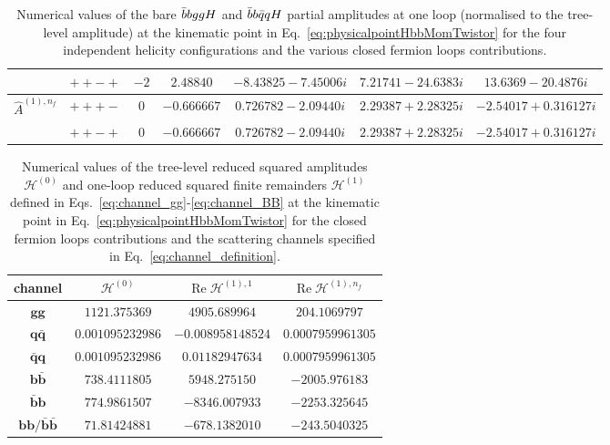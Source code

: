 \documentclass[main.tex]{subfiles}
\begin{document}
\begin{table}[t!]
\begin{tabularx}{1.0\textwidth}{|C{0.7}|C{0.8}|C{0.5}|C{1.2}|C{1.2}|C{1.3}|C{1.3}|}
                 & $++-+$ & $ -2 $ & $ 2.48840$ & $ -8.43825 - 7.45006 i$ & $ 7.21741 - 24.6383 i$ & $ 13.6369 - 20.4876 i $ \\
\hline
$\hat A^{(1),n_f}$ & $+++-$ & $ 0$ & $ -0.666667$ & $ 0.726782 - 2.09440 i$ & $ 2.29387 + 2.28325 i$ & $ -2.54017 + 0.316127 i $ \\
                   & $++-+$ & $ 0$ & $ -0.666667$ & $ 0.726782 - 2.09440 i$ & $ 2.29387 + 2.28325 i$ & $ -2.54017 + 0.316127 i $ \\
\hline
\end{tabularx}
\caption{\label{tab:benchmarkbare1L} Numerical values of the bare $\bar{b}bggH$ and $\bar{b}b\bar{q}qH$ partial amplitudes at one loop (normalised to the tree-level amplitude) at the kinematic point in 
Eq.~\ref{eq:physicalpointHbbMomTwistor} for the four independent helicity configurations and the various closed fermion loops contributions. }
\end{table}

\begin{table}[t!]
\centering
\begin{tabularx}{0.85\textwidth}{|C{0.7}|C{1.1}|C{1.1}|C{1.1}|}
\hline
channel & $\mathcal{H}^{(0)}$ & $\mathrm{Re}\;\mathcal{H}^{(1),1}$ & $\mathrm{Re}\;\mathcal{H}^{(1),n_f}$  \\
\hline
$\mathbf{gg}$       & $ 1121.375369 $    & $ 4905.689964$ & $ 204.1069797 $ \\
$\mathbf{q\bar{q}}$ & $ 0.001095232986 $ & $ -0.008958148524$ & $ 0.0007959961305 $ \\
$\mathbf{\bar{q}q}$ & $ 0.001095232986 $ & $ 0.01182947634$ & $ 0.0007959961305 $ \\
$\mathbf{b\bar{b}}$ & $ 738.4111805 $ & $ 5948.275150$ & $ -2005.976183 $ \\
$\mathbf{\bar{b}b}$ & $ 774.9861507 $ & $ -8346.007933$ & $ -2253.325645 $ \\
$\mathbf{bb}/\mathbf{\bar{b}\bar{b}}$ & $ 71.81424881 $  & $ -678.1382010$ & $ -243.5040325 $ \\
\hline
\end{tabularx}
\caption{\label{tab:benchmarkfinremsq1L} Numerical values of the tree-level reduced squared amplitudes  $\mathcal{H}^{(0)}$ and 
one-loop reduced squared finite remainders $\mathcal{H}^{(1)}$ 
defined in Eqs.~\ref{eq:channel_gg}-\ref{eq:channel_BB} at the kinematic point in 
Eq.~\ref{eq:physicalpointHbbMomTwistor} for  the closed fermion loops contributions and the scattering channels specified in Eq.~\ref{eq:channel_definition}.}
\end{table}
\end{document}
